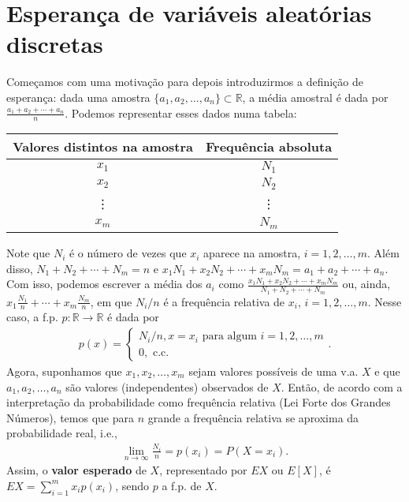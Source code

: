 \documentclass[../Notas.tex]{subfiles}
\begin{document}

\section{Esperança de variáveis aleatórias discretas}
Começamos com uma motivação para depois introduzirmos a definição de esperança: dada uma amostra $\{ a_1, a_2, \dots, a_n \}\subset\mathbb{R}$, a média amostral é dada por $\displaystyle{ \frac{a_1 + a_2 + \cdots + a_n}{n} }$. Podemos representar esses dados numa tabela:
\begin{table}[H]
    \centering
    \begin{tabular}{c|c}
        Valores distintos na amostra & Frequência absoluta \\
        \hline
        $x_1$ & $N_1$ \\
        $x_2$ & $N_2$ \\
        \vdots & \vdots \\
        $x_m$ & $N_m$
    \end{tabular}
\end{table}
Note que $N_i$ é o número de vezes que $x_i$ aparece na amostra, $i= 1,2,\dots, m$. Além disso, $N_1 + N_2 + \cdots + N_m = n$ e $x_1N_1 + x_2N_2 + \cdots + x_mN_m = a_1 + a_2 + \cdots + a_n$. Com isso, podemos escrever a média dos $a_i$ como $\displaystyle{ \frac{x_1N_1 + x_2N_2 + \cdots + x_mN_m}{N_1 + N_2 + \cdots + N_m} }$ ou, ainda, $\displaystyle{ x_1\frac{N_1}{n} + \cdots + x_m\frac{N_m}{n} }$, em que $N_i/n$ é a frequência relativa de $x_i$, $i=1,2,\dots,m$. Nesse caso, a f.p. $p:\mathbb{R}\to\mathbb{R}$ é dada por
\begin{align*}
    p(x) = \begin{cases}
    N_i/n, x=x_i \text{ para algum } i=1,2,\dots,m \\
    0, \text{ c.c.}
    \end{cases}.
\end{align*}
Agora, suponhamos que $x_1, x_2, \dots, x_m$ sejam valores possíveis de uma v.a. $X$ e que $a_1, a_2, \dots, a_n$ são valores (independentes) observados de $X$. Então, de acordo com a interpretação da probabilidade como frequência relativa (Lei Forte dos Grandes Números), temos que para $n$ grande a frequência relativa se aproxima da probabilidade real, i.e.,
\begin{align*}
    \lim_{n\to\infty}\frac{N_i}{n} = p(x_i) = P(X=x_i).
\end{align*}
Assim, o \textbf{valor esperado} de $X$, representado por $EX$ ou $E[X]$, é $\displaystyle{ EX = \sum_{i=1}^{m}x_i p(x_i) }$, sendo $p$ a f.p. de $X$.
\end{document}
